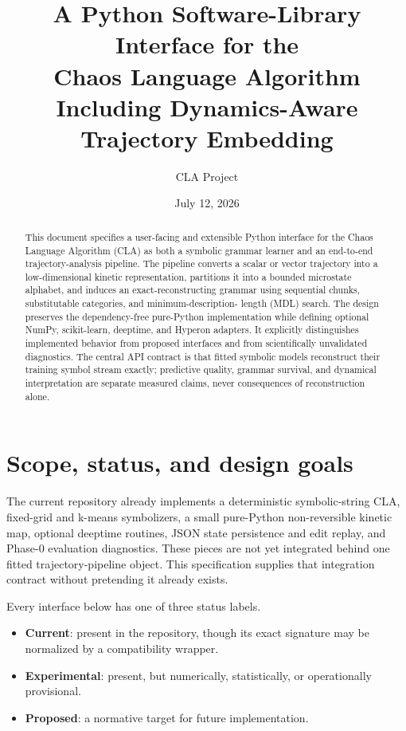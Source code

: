 \documentclass[11pt]{article}
\title{A Python Software-Library Interface for the\\
Chaos Language Algorithm\\
Including Dynamics-Aware Trajectory Embedding}
\author{CLA Project}
\date{July 12, 2026}
\newcommand{\Current}{\textbf{Current}}
\newcommand{\Proposed}{\textbf{Proposed}}
\newcommand{\Experimental}{\textbf{Experimental}}
\begin{document}
\maketitle

\begin{abstract}
This document specifies a user-facing and extensible Python interface for the
Chaos Language Algorithm (CLA) as both a symbolic grammar learner and an
end-to-end trajectory-analysis pipeline. The pipeline converts a scalar or
vector trajectory into a low-dimensional kinetic representation, partitions it
into a bounded microstate alphabet, and induces an exact-reconstructing grammar
using sequential chunks, substitutable categories, and minimum-description-
length (MDL) search. The design preserves the dependency-free pure-Python
implementation while defining optional NumPy, scikit-learn, deeptime, and
Hyperon adapters. It explicitly distinguishes implemented behavior from proposed
interfaces and from scientifically unvalidated diagnostics. The central API
contract is that fitted symbolic models reconstruct their training symbol stream
exactly; predictive quality, grammar survival, and dynamical interpretation are
separate measured claims, never consequences of reconstruction alone.
\end{abstract}

\tableofcontents

\section{Scope, status, and design goals}

The current repository already implements a deterministic symbolic-string CLA,
fixed-grid and k-means symbolizers, a small pure-Python non-reversible kinetic
map, optional deeptime routines, JSON state persistence and edit replay, and
Phase-0 evaluation diagnostics. These pieces are not yet integrated behind one
fitted trajectory-pipeline object. This specification supplies that integration
contract without pretending it already exists.

Every interface below has one of three status labels.
\begin{itemize}[nosep]
\item \Current: present in the repository, though its exact signature may be
  normalized by a compatibility wrapper.
\item \Experimental: present, but numerically, statistically, or operationally
  provisional.
\item \Proposed: a normative target for future implementation.
\end{itemize}
\end{document}
